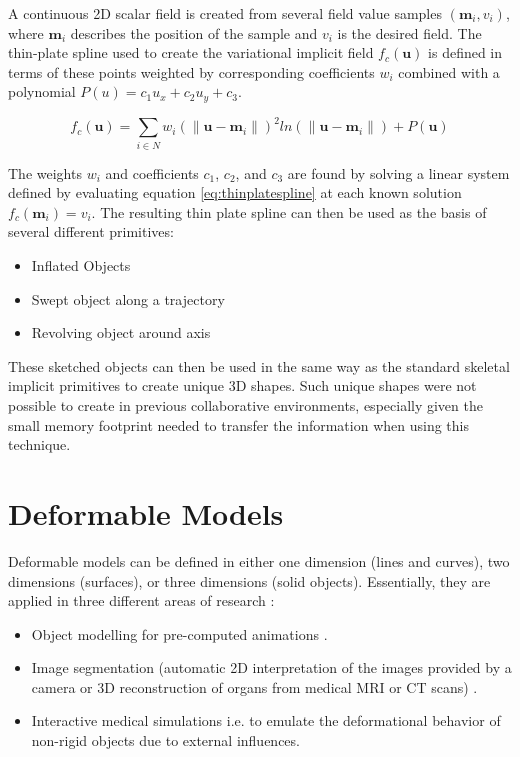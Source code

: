 A continuous 2D scalar field is created from several field value samples $(\mathbf{m}_i, v_i)$, where $\mathbf{m}_i$ describes the 
position of the sample and $v_i$ is the desired field. The thin-plate spline used to create the variational 
implicit field $f_c(\mathbf{u})$ is defined in terms of these points weighted by corresponding coefficients $w_i$ combined with a polynomial 
$P(u) = c_1u_x +c_2u_y +c_3$.

\begin{equation}
f_c(\mathbf{u}) = \sum_{i \in N} w_i(\|\mathbf{u}-\mathbf{m}_i\|)^2ln(\|\mathbf{u}-\mathbf{m}_i\|)+P(\mathbf{u}) 
\label{eq:thinplatespline}
\end{equation}

The weights $w_i$ and coefficients $c_1$, $c_2$, and $c_3$ are found by solving a linear system defined by evaluating 
equation \ref{eq:thinplatespline} at each known solution $f_c(\mathbf{m}_i)=v_i$.
The resulting thin plate spline can then be used as the basis of several different primitives:

\begin{itemize}
 \item Inflated Objects
 \item Swept object along a trajectory
 \item Revolving object around axis
\end{itemize}

These sketched objects can then be used in the same way as the standard skeletal implicit primitives to create unique 3D shapes. Such 
unique shapes were not possible to create in previous collaborative environments, especially given the small memory footprint 
needed to transfer the information when using this technique.

\section{Deformable Models}
Deformable models can be defined in either one dimension (lines and curves), two dimensions (surfaces), 
or three dimensions (solid objects).  Essentially, they are applied in three different areas of 
research \cite{Meier2005}: 

\begin{itemize}
 \item Object modelling for pre-computed animations \cite{Coquillart1990, hsu1992direct}.
 \item Image segmentation (automatic 2D interpretation of the images provided by a camera or 3D 
 reconstruction of organs from medical MRI or CT scans) \cite{neveu1994recovery}.
 \item Interactive medical simulations i.e. to emulate the deformational behavior of non-rigid objects 
 due to external influences.
\end{itemize}

